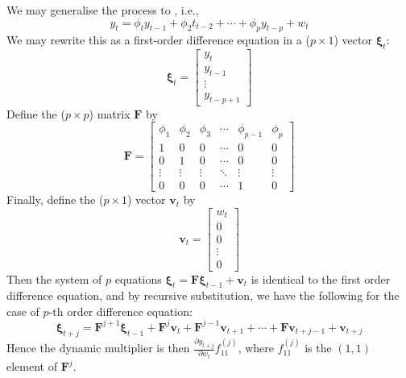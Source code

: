 We may generalise the process to , i.e.,
\begin{equation}
y_t = \phi_t y_{t-1} + \phi_2 t_{t-2} + \cdots + \phi_p y_{t-p} + w_t \nonumber
\end{equation}
We may rewrite this as a first-order difference equation in a ($p \times 1$) vector $\bm{\xi}_t$:
\begin{equation}
\bm{\xi}_t = 
\begin{bmatrix}
y_t \\
y_{t-1} \\ 
\vdots \\
y_{t-p+1}
\end{bmatrix} \nonumber
\end{equation}
Define the ($p \times p$) matrix $\bm{F}$ by
\begin{equation}
\bm{F} =
\begin{bmatrix}
\phi_1 & \phi_2 & \phi_3 & \cdots & \phi_{p-1} & \phi_p \\
1 & 0 & 0 & \cdots & 0 & 0 \\
0 & 1 & 0 & \cdots & 0 & 0 \\
\vdots & \vdots & \vdots & \ddots & \vdots & \vdots \\
0 & 0 & 0 & \cdots & 1 & 0
\end{bmatrix} \nonumber
\end{equation}
Finally, define the ($p \times 1$) vector $\bm{v}_t$ by
\begin{equation}
\bm{v}_t =
\begin{bmatrix}
w_t \\
0 \\
0 \\
\vdots \\
0
\end{bmatrix} \nonumber
\end{equation}
Then the system of $p$ equations $\bm{\xi}_t = \bm{F} \bm{\xi}_{t-1} + \bm{v}_t$ is identical to the first order difference equation, and by recursive substitution, we have the following for the case of $p$-th order difference equation:
\begin{equation}
\bm{\xi}_{t + j} = \bm{F}^{j+1} \bm{\xi}_{t-1} + \bm{F}^{j} \bm{v}_{t} + \bm{F}^{j-1} \bm{v}_{t+1} + \cdots + \bm{F} \bm{v}_{t+j-1} + \bm{v}_{t+j} \nonumber
\end{equation}
Hence the dynamic multiplier is then $\frac{\partial y_{t+j}}{\partial w_t} f^{(j)}_{11}$, where $f^{(j)}_{11}$ is the $(1,1)$ element of $\bm{F}^j$.

